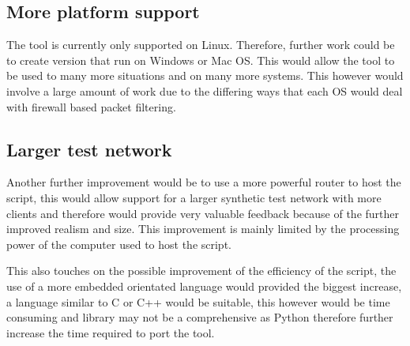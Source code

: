 \subsection{More platform support}
The tool is currently only supported on Linux. Therefore, further work could be to create version that run on Windows or Mac OS. This would allow the tool to be used to many more situations and on many more systems. This however would involve a large amount of work due to the differing ways that each OS would deal with firewall based packet filtering.


\subsection{Larger test network}
Another further improvement would be to use a more powerful router to host the script, this would allow support for a larger synthetic test network with more clients and therefore would provide very valuable feedback because of the further improved realism and size. This improvement is mainly limited by the processing power of the computer used to host the script. 

This also touches on the possible improvement of the efficiency of the script, the use of a more embedded orientated language would provided the biggest increase, a language similar to C or C++ would be suitable, this however would be time consuming and library may not be a comprehensive as Python therefore further increase the time required to port the tool.